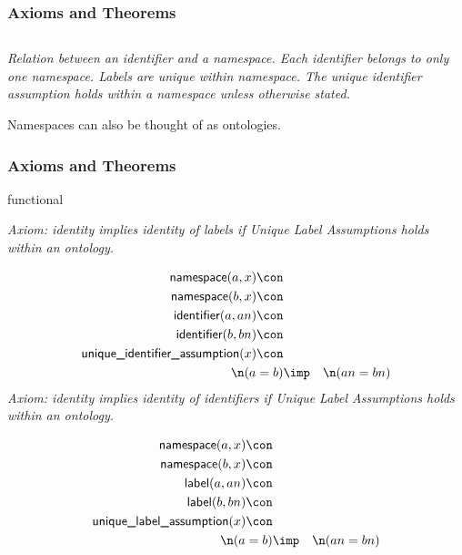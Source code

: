 \subsubsection{Axioms and Theorems}



\subsection{ }
\emph{Relation between an identifier and a namespace. Each identifier belongs to only one namespace. Labels are unique within namespace. The unique identifier assumption holds within a namespace unless otherwise stated.}

Namespaces can also be thought of as ontologies.

\subsubsection{Axioms and Theorems}

\begin{clist}
\item functional
\end{clist}

\emph{Axiom: identity implies identity of labels if Unique Label Assumptions holds within an ontology. }

\begin{eqnarray*}
 \pr{namespace}(a, x) \con \\
 \pr{namespace}(b, x) \con \\
 \pr{identifier}(a, an) \con \\
 \pr{identifier}(b, bn) \con \\
 \pr{unique\_identifier\_assumption}(x) \con \\
 \n(a = b)&\imp & \n(an = bn)
\end{eqnarray*}
\emph{Axiom: identity implies identity of identifiers if Unique Label Assumptions holds within an ontology. }

\begin{eqnarray*}
 \pr{namespace}(a, x) \con \\
 \pr{namespace}(b, x) \con \\
 \pr{label}(a, an) \con \\
 \pr{label}(b, bn) \con \\
 \pr{unique\_label\_assumption}(x) \con \\
 \n(a = b)&\imp & \n(an = bn)
\end{eqnarray*}

